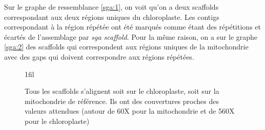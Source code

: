 \documentclass[a4paper]{article}
\makeatletter
\newcommand*{\centerfloat}{%
  \parindent \z@
  \leftskip \z@ \@plus 1fil \@minus \textwidth
  \rightskip\leftskip
  \parfillskip \z@skip}
\makeatother
\begin{document}
Sur le graphe de ressemblance \ref{sga:1}, on voit qu'on a deux scaffolds correspondant aux deux régions uniques du chloroplaste. Les contigs correspondant à la région répétée ont été marqués comme étant des répétitions et écartés de l'assemblage par \textit{sga scaffold}. Pour la même raison, on a sur le graphe \ref{sga:2} des scaffolds qui correspondent aux régions uniques de la mitochondrie avec des gaps qui doivent correspondre aux régions répétées. 


\begin{figure}[H]
\centerfloat

 \hspace{5mm}

\label{scaf}
\caption{Tous les scaffolds s'alignent soit sur le chloroplaste, soit sur la mitochondrie de référence. Ils ont des couvertures proches des valeurs attendues (autour de 60X pour la mitochondrie et de 560X pour le chloroplaste)}
\end{figure}
\end{document}
